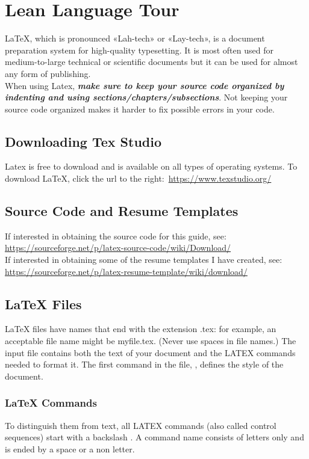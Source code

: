 \section{Lean Language Tour}
\vspace{10.5cm}
	LaTeX, which is pronounced «Lah-tech» or «Lay-tech», is a document preparation system for high-quality typesetting. It is most often used for medium-to-large technical or scientific documents but it can be used for almost any form of publishing.\\
	When using Latex, \textbf{\emph{make sure to keep your source code organized by indenting and using sections/chapters/subsections}}. Not keeping your source code organized makes it harder to fix possible errors in your code.
	\subsection{Downloading Tex Studio}
			Latex is free to download and is available on all types of operating systems. To download \LaTeX, click the url to the right:\, \url{https://www.texstudio.org/}
	\subsection{Source Code and Resume Templates}
			If interested in obtaining the source code for this guide, see:\\
			\url{https://sourceforge.net/p/latex-source-code/wiki/Download/}\\
			If interested in obtaining some of the resume templates I have created, see:\\ \url{https://sourceforge.net/p/latex-resume-template/wiki/download/}
	\subsection{LaTeX Files}
			LaTeX files have names that end with the extension .tex: for example, an acceptable file name might be myfile.tex. (Never use spaces in file names.) The input file contains both the text of your document and the LATEX commands needed to format it. The first command in the file, , defines the style of the document.
	\subsubsection{LaTeX Commands}
			To distinguish them from text, all LATEX commands (also called control sequences) start with a backslash \cs. A command name consists of letters only and is ended by a space or a non letter.
